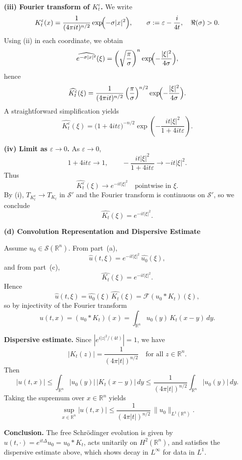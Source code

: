 \begin{problem}[CP-III-0019]
\par\smallskip\noindent\textbf{\textbf{(iii) Fourier transform of $K_t^\varepsilon$.}}\quad
We write
\[
K_t^\varepsilon(x)
= \frac{1}{(4\pi i t)^{n/2}}\exp\!\Bigl(-\sigma |x|^2\Bigr),
\qquad
\sigma := \varepsilon - \frac{i}{4t},\quad \Re(\sigma)>0.
\]
Using (ii) in each coordinate, we obtain
\[
\widehat{e^{-\sigma |x|^2}}(\xi)
= \left(\sqrt{\frac{\pi}{\sigma}}\right)^n
\exp\!\Bigl(-\frac{|\xi|^2}{4\sigma}\Bigr),
\]
hence
\[
\widehat{K_t^\varepsilon}(\xi)
= \frac{1}{(4\pi i t)^{n/2}}
\left(\frac{\pi}{\sigma}\right)^{n/2}
\exp\!\Bigl(-\frac{|\xi|^2}{4\sigma}\Bigr).
\]
A straightforward simplification yields
\[
\widehat{K_t^\varepsilon}(\xi)
= \bigl(1+4it\varepsilon\bigr)^{-n/2}
\exp\!\left(-\frac{it|\xi|^2}{1+4it\varepsilon}\right).
\]

\par\smallskip\noindent\textbf{\textbf{(iv) Limit as $\varepsilon\to0$.}}\quad
As $\varepsilon\to0$,
\[
1+4it\varepsilon \to 1,
\qquad
-\frac{it|\xi|^2}{1+4it\varepsilon} \to -it|\xi|^2.
\]
Thus
\[
\widehat{K_t^\varepsilon}(\xi) \longrightarrow e^{-it|\xi|^2}
\quad\text{pointwise in }\xi.
\]
By (i), $T_{K_t^\varepsilon}\to T_{K_t}$ in $\mathscr{S}'$ and the
Fourier transform is continuous on $\mathscr{S}'$, so we conclude
\[
\widehat{K_t}(\xi) = e^{-it|\xi|^2}.
\]

\par\smallskip\noindent\textbf{(d) \; Convolution Representation and Dispersive Estimate}\quad

Assume $u_0\in\mathscr{S}(\mathbb{R}^n)$. From part~(a),
\[
\widehat{u}(t,\xi) = e^{-it|\xi|^2}\,\widehat{u_0}(\xi),
\]
and from part~(c),
\[
\widehat{K_t}(\xi) = e^{-it|\xi|^2}.
\]
Hence
\[
\widehat{u}(t,\xi)
= \widehat{u_0}(\xi)\,\widehat{K_t}(\xi)
= \mathcal{F}(u_0 * K_t)(\xi),
\]
so by injectivity of the Fourier transform
\[
u(t,x) = (u_0 * K_t)(x)
= \int_{\mathbb{R}^n} u_0(y)\,K_t(x-y)\,dy.
\]

\par\smallskip\noindent\textbf{\textbf{Dispersive estimate.}}\quad
Since $|e^{i|z|^2/(4t)}| = 1$, we have
\[
|K_t(z)| = \frac{1}{(4\pi |t|)^{n/2}}
\quad\text{for all } z\in\mathbb{R}^n.
\]
Then
\[
|u(t,x)|
\le \int_{\mathbb{R}^n} |u_0(y)|\,|K_t(x-y)|\,dy
\le \frac{1}{(4\pi|t|)^{n/2}} \int_{\mathbb{R}^n} |u_0(y)|\,dy.
\]
Taking the supremum over $x\in\mathbb{R}^n$ yields
\[
\sup_{x\in\mathbb{R}^n} |u(t,x)|
\le \frac{1}{(4\pi|t|)^{n/2}}\,\|u_0\|_{L^1(\mathbb{R}^n)}.
\]

\par\smallskip\noindent\textbf{\textbf{Conclusion.}}\quad
The free Schrödinger evolution is given by
$u(t,\cdot)=e^{it\Delta}u_0=u_0*K_t$,
acts unitarily on $H^2(\mathbb{R}^n)$, and satisfies the dispersive
estimate above, which shows decay in $L^\infty$ for data in $L^1$.


\end{problem}
